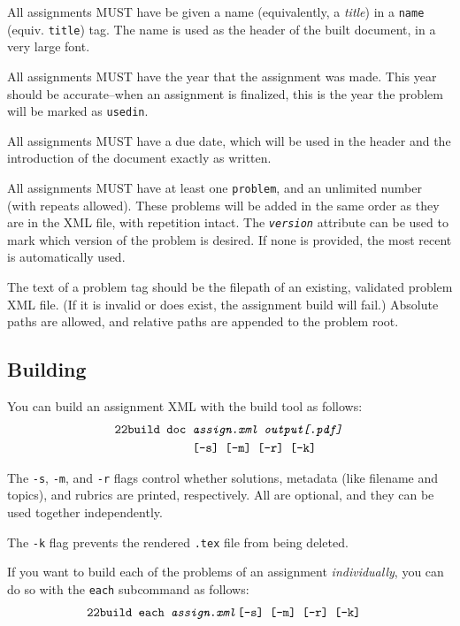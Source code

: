     All assignments MUST have be given a name (equivalently, a \textit{title})
    in a \texttt{name} (equiv. \texttt{title}) tag. The name is used as the 
    header of the built document, in a very large font.
    
    All assignments MUST have the year that the assignment was made. This 
    year should be accurate--when an assignment is finalized, this is the 
    year the problem will be marked as \texttt{usedin}.
    
    All assignments MUST have a due date, which will be used in the header 
    and the introduction of the document exactly as written. 
    
    All assignments MUST have at least one \texttt{problem}, and an 
    unlimited number (with repeats allowed). These problems will be added in 
    the same order as they are in the XML file, with repetition intact. The 
    \texttt{\textit{version}} attribute can be used to mark which version of 
    the problem is desired. If none is provided, the most recent is 
    automatically used.
    
    The text of a problem tag should be the filepath of an existing, 
    validated problem XML file. (If it is invalid or does exist, the 
    assignment build will fail.) Absolute paths are allowed, and
    relative paths are appended to the problem root.
    
  \subsection{Building}
    You can build an assignment XML with the build tool as follows: 
    \begin{align*}
      \texttt{22build }\texttt{doc }&\texttt{\textit{assign.xml output[.pdf]}}\\
      ~&\texttt{[-s] [-m] [-r] [-k]}
    \end{align*}
    
    The \texttt{-s}, \texttt{-m}, and \texttt{-r} flags control whether 
    solutions, metadata (like filename and topics), and rubrics are printed, 
    respectively. All are optional, and they can be used together independently.
    
    The \texttt{-k} flag prevents the rendered \texttt{.tex} file from
    being deleted.

    If you want to build each of the problems of an assignment
    \emph{individually}, you can do so with the \texttt{each} subcommand as
    follows:\tabularnewline
    \begin{align*}
      \texttt{22build }\texttt{each }&\texttt{\textit{assign.xml}}
      \texttt{[-s] [-m] [-r] [-k]}
    \end{align*}

